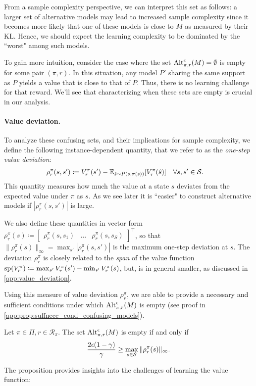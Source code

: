  From a sample complexity perspective, we can interpret this set as follows: a larger set of alternative models may lead to increased sample complexity since it becomes more likely that one of these models is close to $M$ as measured by their KL. Hence, we should expect the learning complexity to be dominated by the ``worst" among such models.


 
To gain more intuition, consider the case where the set ${\rm Alt}_{\pi,r}^\epsilon(M) = \emptyset$ is empty for some pair $(\pi,r)$. In this situation, any  model $P'$ sharing the same support as $P$ yields a value that is close to that of $P$. Thus, there is no  learning challenge for that reward. We'll see that characterizing when these sets are empty is crucial in our analysis. 



\paragraph{Value deviation.} To analyze these confusing sets, and their implications for sample complexity, we define the following instance-dependent quantity, that we refer to as the \emph{one-step value deviation}:
\begin{align*}\rho_r^\pi(s,s')&\coloneqq V_r^\pi(s') - \mathbb{E}_{\hat s \sim P(s,\pi(s))}[V_r^\pi(\hat s)] \quad\forall s,s'\in{\cal S}.
\end{align*}
This quantity measures how much the value at a state $s$ deviates from the expected value under $\pi$ as $s$. As we see later it is ``easier" to construct alternative models if $|\rho_r^\pi(s,s')|$ is large.

We also define these quantities in vector form
$
\rho_r^\pi(s) \coloneqq \begin{bmatrix}
    \rho_r^\pi(s,s_1) &\dots &\rho_r^\pi(s,s_S)
\end{bmatrix}^\top$,
so that $\|\rho_r^\pi(s)\|_\infty= \max_{s'} |\rho_r^\pi(s,s')|$ is the maximum
one-step deviation at $s$. 
The deviation $\rho_r^\pi$ is closely related to the \emph{span} of the value function $
    {\rm sp}(V_r^\pi) \coloneqq \max_{s'}V_r^\pi(s')-\min_{s'} V_r^\pi(s)$,
but, is in general smaller, as discussed  in \cref{app:value_deviation}.

Using this measure of value deviation  $\rho_r^\pi$, we are able to provide a necessary and sufficient conditions under which ${\rm Alt}_{\pi,r}^\epsilon(M)$ is empty (see proof in \cref{app:prop:suffnecc_cond_confusing_models}).
\begin{tcolorbox}
\begin{proposition}\label{prop:suffnecc_cond_confusing_models}
   Let $\pi\in \Pi,r \in \mathcal{R}_\pi$. The set ${\rm Alt}_{\pi,r}^\epsilon(M)$ is empty if and only if
   \[\frac{2\epsilon(1 - \gamma)}{\gamma } \geq \max_{s\in {\cal S}} \|\rho_r^\pi(s)\|_\infty.
   \]
\end{proposition}
\end{tcolorbox}
The proposition provides insights into the challenges of learning the value function:

